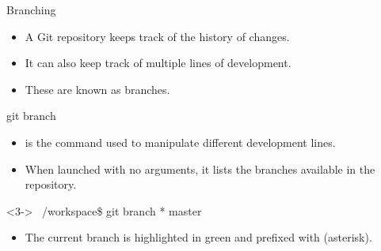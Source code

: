 \begin{frame}[fragile]{Branching}
\begin{itemize}[<+->]
	  \item A Git repository keeps track of the history of changes.
    \item It can also keep track of multiple lines of development.
    \item These are known as \alert{branches}.
\end{itemize}
\end{frame}

\begin{frame}[fragile]{git branch}
    \begin{itemize}[<+->]
        \item {} is the command used to manipulate different development lines.
        \item When launched with no arguments, it lists the branches available in the repository.
    \end{itemize}
    \begin{shellblock}<3->
~/workspace\$ git branch\inserthitenter
{\color{white}*} master
\end{shellblock}
    \begin{itemize}[<4->]
        \item The current branch is highlighted in green and prefixed with \code{*} (asterisk).
    \end{itemize}
\end{frame}

